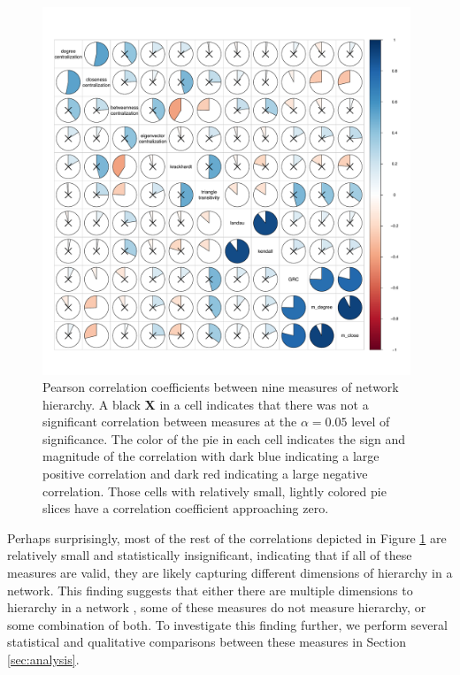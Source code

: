 \documentclass[3p,times]{elsarticle}
\begin{document}
\begin{figure}
\begin{center}
	\caption{\label{fig:measure correlations} Pearson correlation coefficients between nine measures of network hierarchy. A black \textbf{X} in a cell indicates that there was not a significant correlation between measures at the $\alpha = 0.05$ level of significance. The color of the pie in each cell indicates the sign and magnitude of the correlation with dark blue indicating a large positive correlation and dark red indicating a large negative correlation. Those cells with relatively small, lightly colored pie slices have a correlation coefficient approaching zero.}
		\includegraphics[width = 0.98\textwidth]{./images/Global_Measure_Correlations_with_Tests.pdf}
\end{center}
\end{figure}

Perhaps surprisingly, most of the rest of the correlations depicted in Figure \ref{fig:measure correlations} are relatively small and statistically insignificant, indicating that if all of these measures are valid, they are likely capturing different dimensions of hierarchy in a network. This finding suggests that either there are multiple dimensions to hierarchy in a network \cite{Corominas-Murtra2013}, some of these measures do not measure hierarchy, or some combination of both. To investigate this finding further, we perform several statistical and qualitative comparisons between these measures in Section \ref{sec:analysis}.
	
\end{document}
